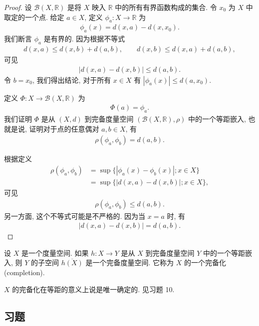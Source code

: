 \documentclass[../../main.tex]{subfiles}
\begin{document}
\begin{proof}
设 $\mathcal{B}(X,\mathbb{R})$ 是将 $X$ 映入 $\mathbb{R}$ 中的所有有界函数构成的集合. 令 $x_0$ 为 $X$ 中取定的一个点. 给定 $a\in X$, 定义 $\phi_a\colon X\to\mathbb{R}$ 为
\begin{align*}
\phi_a(x)=d(x,a)-d(x,x_0).
\end{align*}
我们断言 $\phi_a$ 是有界的. 因为根据不等式
\begin{align*}
d(x,a)\leqslant d(x,b)+d(a,b),\qquad d(x,b)\leqslant d(x,a)+d(a,b),
\end{align*}
可见
\begin{align*}
|d(x,a)-d(x,b)|\leqslant d(a,b).
\end{align*}
令 $b=x_0$, 我们得出结论, 对于所有 $x\in X$ 有 $|\phi_a(x)|\leqslant d(a,x_0)$.

定义 $\Phi\colon X\to\mathcal{B}(X,\mathbb{R})$ 为
\begin{align*}
\Phi(a)=\phi_a.
\end{align*}
我们证明 $\Phi$ 是从 $(X,d)$ 到完备度量空间 $(\mathcal{B}(X,\mathbb{R}),\rho)$ 中的一个等距嵌入, 也就是说, 证明对于点的任意偶对 $a,b\in X$, 有
\begin{align*}
\rho(\phi_a,\phi_b)=d(a,b).
\end{align*}

根据定义
\begin{align*}
\rho(\phi_a,\phi_b)&=\sup\{|\phi_a(x)-\phi_b(x)|;x\in X\}\\
&=\sup\{|d(x,a)-d(x,b)|;x\in X\},
\end{align*}
可见
\begin{align*}
\rho(\phi_a,\phi_b)\leqslant d(a,b).
\end{align*}
另一方面, 这个不等式可能是不严格的. 因为当 $x=a$ 时, 有
\begin{align*}
|d(x,a)-d(x,b)|=d(a,b).
\end{align*}
\end{proof}

\begin{definition}\label{definition:ch07-completion}
设 $X$ 是一个度量空间. 如果 $h\colon X\to Y$ 是从 $X$ 到完备度量空间 $Y$ 中的一个等距嵌入, 则 $Y$ 的子空间 $\overline{h(X)}$ 是一个完备度量空间. 它称为 $X$ 的一个完备化(completion).
\end{definition}

$X$ 的完备化在等距的意义上说是唯一确定的. 见习题 10.

\subsection*{习题}
\end{document}
